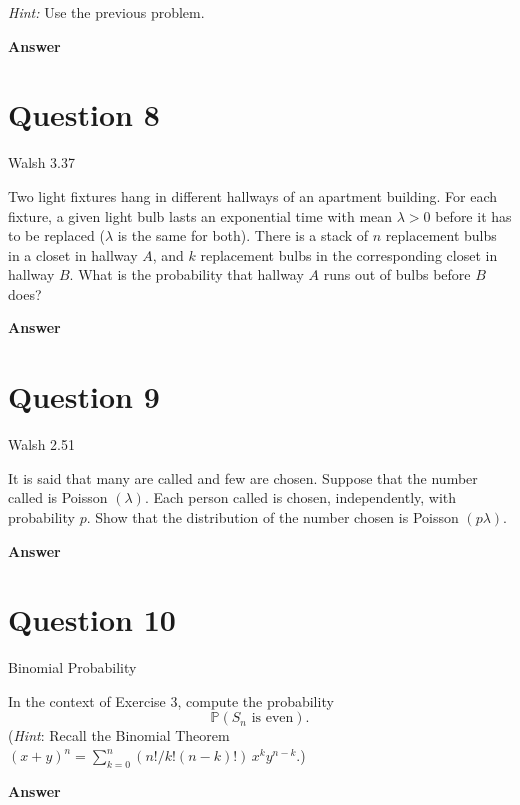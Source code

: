 \documentclass[letterpaper]{article}
\begin{document}
		\medskip
		
		\textit{Hint:} Use the previous problem.
		
		
		\textbf{Answer}
		
		\clearpage
		
		\section{Question 8}
		
		
		{\color{deepred} Walsh 3.37}
		 
		Two light fixtures hang in different hallways of an apartment building.
		For each fixture, a given light bulb lasts an exponential time with mean
		$\lambda > 0$ before it has to be replaced ($\lambda$ is the same for both).
		There is a stack of $n$ replacement bulbs in a closet in hallway $A$,
		and $k$ replacement bulbs in the corresponding closet in hallway $B$.
		What is the probability that hallway $A$ runs out of bulbs before $B$ does?
		
		\textbf{Answer}
		
		\clearpage
		
		\section{Question 9}
		
		{\color{deepred} Walsh 2.51} 
		
		It is said that many are called and few are chosen. Suppose that the number called is Poisson $(\lambda)$. Each person called is chosen, independently, with probability $p$. Show that the distribution of the number chosen is Poisson $(p\lambda)$.
		
		
		\textbf{Answer}
		
		\clearpage
		
		\section{Question 10}
		
		{\color{deepred} Binomial Probability} 
		
		In the context of Exercise 3, compute the probability
		\[
		\mathbb{P}(S_n \text{ is even}).
		\]
		(\textit{Hint}: Recall the Binomial Theorem $(x + y)^n = \sum_{k=0}^n (n!/k!(n - k)!) \, x^k y^{n-k}$.)
		
		
		\textbf{Answer}
		
		\clearpage
		
		
		
		
	
\end{document}
